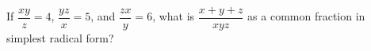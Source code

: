 If $\dfrac{xy}{z}=4$, $\dfrac{yz}{x }=5$, and $\dfrac{zx}{y}=6$, what is $\dfrac{x+y+z}{xyz}$ as a common fraction in simplest radical form?
